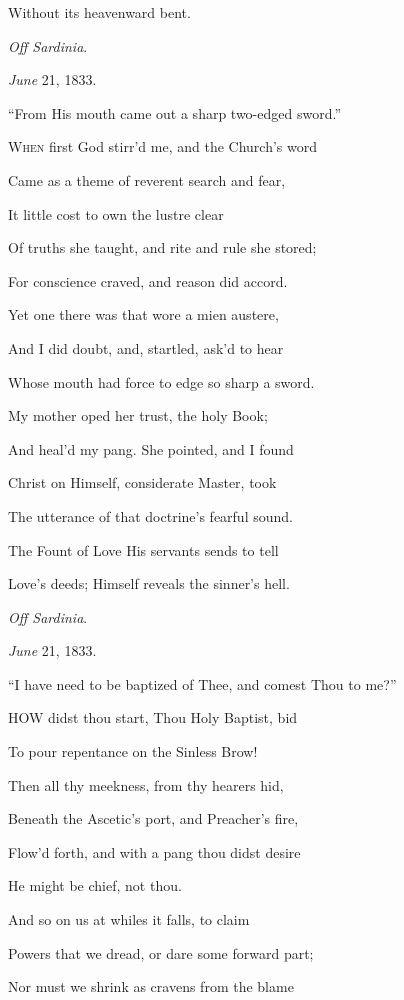 Without its heavenward bent.

\emph{Off Sardinia}.

\emph{June} 21, 1833.


``From His mouth came out a sharp two-edged
sword.''

W\textsc{hen} first God stirr'd me, and the Church's word

Came as a theme of reverent search and fear,

It little cost to own the lustre clear

Of truths she taught, and rite and rule she stored;

For conscience craved, and reason did accord.

Yet one there was that wore a mien austere,

And I did doubt, and, startled, ask'd to
hear

Whose mouth had force to edge so sharp a sword.

My mother oped her trust, the holy Book;

And heal'd my pang. She pointed, and I found

Christ on Himself, considerate Master, took

The utterance of that doctrine's fearful sound.

The Fount of Love His servants sends to tell

Love's deeds; Himself reveals the sinner's hell.

\emph{Off Sardinia}.

\emph{June} 21, 1833.


``I have need to be baptized of Thee, and
comest Thou to me?''

HOW didst thou start, Thou Holy Baptist, bid

To pour repentance on the Sinless Brow!

Then all thy meekness, from thy hearers hid,

Beneath the Ascetic's port, and Preacher's fire,

Flow'd forth, and with a pang thou didst desire

He might be chief, not thou.

And so on us at whiles it falls, to claim

Powers that we dread, or dare some forward part;

Nor must we shrink as cravens from the blame

